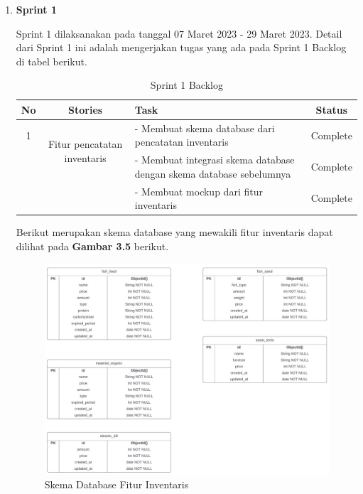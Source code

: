 \begin{enumerate}
	\begin{enumerate}
		\item \textbf{Sprint 1}
		
		Sprint 1 dilaksanakan pada tanggal 07 Maret 2023 - 29 Maret 2023. Detail dari Sprint 1 ini adalah mengerjakan tugas yang ada pada Sprint 1 Backlog di tabel berikut.

		\begin{table}[H]	
			\begin{center}
				\caption{Sprint 1 Backlog}
				\label{tab:table6}
				\begin{tabular}{|c|c|m{13em}|c|}
				\hline
				\textbf{No} & \textbf{Stories} & \textbf{Task} & \textbf{Status} \\
				\hline
				1 & \multirow{2}{10em}{Fitur pencatatan inventaris} & - Membuat skema database dari pencatatan inventaris & Complete \\
				&  & - Membuat integrasi skema database dengan skema database sebelumnya & Complete \\
				&  & - Membuat mockup dari fitur inventaris & Complete \\
				\hline
				\end{tabular}
			\end{center}
		\end{table}

		Berikut merupakan skema database yang mewakili fitur inventaris dapat dilihat pada \textbf{Gambar 3.5} berikut.
		
		\begin{figure}[H]
			\centering
			\includegraphics[width=1\textwidth]{gambar/sprint1/sprint1_inventaris_database.jpeg}
			\caption{Skema Database Fitur Inventaris}
		\end{figure}
	

\end{enumerate}
\end{enumerate}
